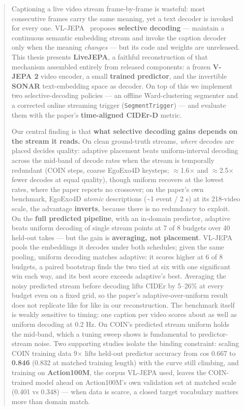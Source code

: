 \medskip

\begin{abstract}

Captioning a live video stream frame-by-frame is wasteful: most consecutive frames carry the same meaning, yet a text decoder is invoked for every one. VL-JEPA~\cite{vljepa2025} proposes \textbf{selective decoding} --- maintain a continuous semantic embedding stream and invoke the caption decoder only when the meaning \emph{changes} --- but its code and weights are unreleased. This thesis presents \textbf{LiveJEPA}, a faithful reconstruction of that mechanism assembled entirely from released components: a frozen \textbf{V-JEPA 2} video encoder, a small \textbf{trained predictor}, and the invertible \textbf{SONAR} text-embedding space as decoder. On top of this we implement two selective-decoding policies --- an offline Ward-clustering segmenter and a corrected online streaming trigger (\texttt{SegmentTrigger}) --- and evaluate them with the paper's \textbf{time-aligned CIDEr-D} metric.

Our central finding is that \textbf{what selective decoding gains depends on the stream it reads.} On clean ground-truth streams, \emph{where} decodes are placed decides quality: adaptive placement beats uniform-interval decoding across the mid-band of decode rates when the stream is temporally redundant (COIN steps, coarse EgoExo4D keysteps; $\approx$1.6$\times$ and $\approx$2.5$\times$ fewer decodes at equal quality), though uniform recovers at the lowest rates, where the paper reports no crossover; on the paper's own benchmark, EgoExo4D \emph{atomic} descriptions (\textasciitilde{}1 event / 2 s) at its 218-video scale, the advantage \textbf{inverts}, because there is no redundancy to exploit. On the \textbf{full predicted pipeline}, with an in-domain predictor, adaptive beats uniform decoding of single stream points at 7 of 8 budgets over 40 held-out takes --- but the gain is \textbf{averaging, not placement}. VL-JEPA pools the embeddings it decodes under both schedules; given the same pooling, uniform decoding matches adaptive: it scores higher at 6 of 8 budgets, a paired bootstrap finds the two tied at six with one significant win each way, and its best score exceeds adaptive's best. Averaging the noisy predicted stream before decoding lifts CIDEr by 5--26\% at every budget even on a fixed grid, so the paper's adaptive-over-uniform result does not replicate like for like in our reconstruction. The benchmark itself is weakly sensitive to timing: one caption per video scores about as well as uniform decoding at 0.2 Hz. On COIN's predicted stream uniform holds the mid-band, which a tuning sweep shows is fundamental to predictor-stream noise. Two supporting studies isolate the binding constraint: scaling COIN training data 9$\times$ lifts held-out predictor accuracy from cos 0.667 to \textbf{0.846} (0.832 at matched training length) with the curve still climbing, and training on \textbf{Action100M}, the corpus VL-JEPA used, leaves the COIN-trained model ahead on Action100M's own validation set at matched scale (0.401 vs 0.348) --- when data is scarce, a closed target vocabulary matters more than domain match.


\end{abstract}
